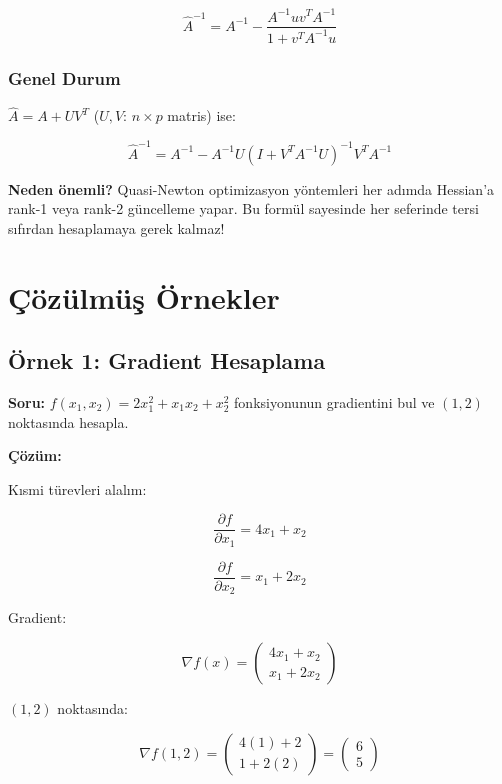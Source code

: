 \documentclass[12pt,a4paper]{article}
\theoremstyle{definition}
\theoremstyle{remark}
\begin{document}
\[
\hat{A}^{-1} = A^{-1} - \frac{A^{-1} u v^T A^{-1}}{1 + v^T A^{-1} u}
\]

\subsubsection{Genel Durum}
$\hat{A} = A + UV^T$ ($U, V$: $n \times p$ matris) ise:

\[
\hat{A}^{-1} = A^{-1} - A^{-1} U (I + V^T A^{-1} U)^{-1} V^T A^{-1}
\]

\textbf{Neden \"onemli?} Quasi-Newton optimizasyon y\"ontemleri her ad{\i}mda Hessian'a rank-1 veya rank-2 g\"uncelleme yapar. Bu form\"ul sayesinde her seferinde tersi s{\i}f{\i}rdan hesaplamaya gerek kalmaz!

\newpage

\section{\c{C}\"oz\"ulm\"u\c{s} \"Ornekler}

\subsection{\"Ornek 1: Gradient Hesaplama}

\textbf{Soru:} $f(x_1, x_2) = 2x_1^2 + x_1 x_2 + x_2^2$ fonksiyonunun gradientini bul ve $(1, 2)$ noktas{\i}nda hesapla.

\textbf{\c{C}\"oz\"um:}

K{\i}smi t\"urevleri alal{\i}m:

\[
\frac{\partial f}{\partial x_1} = 4x_1 + x_2
\]

\[
\frac{\partial f}{\partial x_2} = x_1 + 2x_2
\]

Gradient:

\[
\nabla f(x) = \begin{pmatrix} 4x_1 + x_2 \\ x_1 + 2x_2 \end{pmatrix}
\]

$(1, 2)$ noktas{\i}nda:

\[
\nabla f(1, 2) = \begin{pmatrix} 4(1) + 2 \\ 1 + 2(2) \end{pmatrix} = \begin{pmatrix} 6 \\ 5 \end{pmatrix}
\]
\end{document}
